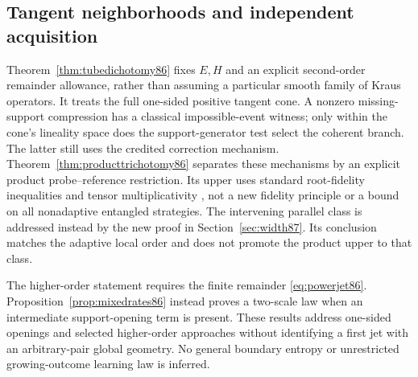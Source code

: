 \subsection{Tangent neighborhoods and independent acquisition}
Theorem~\ref{thm:tubedichotomy86} fixes $E,H$ and an explicit
second-order remainder allowance, rather than assuming a particular
smooth family of Kraus operators.  It treats the full one-sided
positive tangent cone.  A nonzero missing-support compression has a
classical impossible-event witness; only within the cone's lineality
space does the support-generator test select the coherent branch.
The latter still uses the credited correction mechanism.
Theorem~\ref{thm:producttrichotomy86} separates these mechanisms by
an explicit product probe--reference restriction.  Its upper uses
standard root-fidelity inequalities and tensor multiplicativity
\cite[Chapter~3]{Watrous65}, not a new fidelity principle or a bound
on all nonadaptive entangled strategies.  The intervening parallel
class is addressed instead by the new proof in
Section~\ref{sec:width87}.  Its conclusion matches the adaptive
local order and does not promote the product upper to that class.

The higher-order statement requires the finite remainder
\eqref{eq:powerjet86}.  Proposition~\ref{prop:mixedrates86} instead
proves a two-scale law when an intermediate support-opening term is
present.  These results address one-sided openings and selected
higher-order approaches without identifying a first jet with an
arbitrary-pair global geometry.  No general boundary entropy or
unrestricted growing-outcome learning law is inferred.
